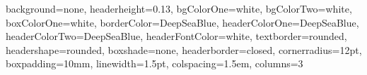 \documentclass[portrait,paperwidth=65cm,paperheight=130cm,fontscale=0.35,dvipsnames]{poster/baposter}
\begin{document}
\begin{poster}
{
  background=none,
  headerheight=0.13\textheight,
  bgColorOne=white,
  bgColorTwo=white,
  boxColorOne=white,
  borderColor=DeepSeaBlue,
  headerColorOne=DeepSeaBlue,
  headerColorTwo=DeepSeaBlue,
  headerFontColor=white,
  textborder=rounded,
  headershape=rounded,
  boxshade=none,
  headerborder=closed,
  cornerradius=12pt,
  boxpadding=10mm,
  linewidth=1.5pt,
  colspacing=1.5em,
  columns=3
}
{\posterLogoLeft}
{\posterHeader \posterFooter \posterTitle}
{\posterAuthors}
{\posterLogoRight}



\end{poster}
\end{document}
